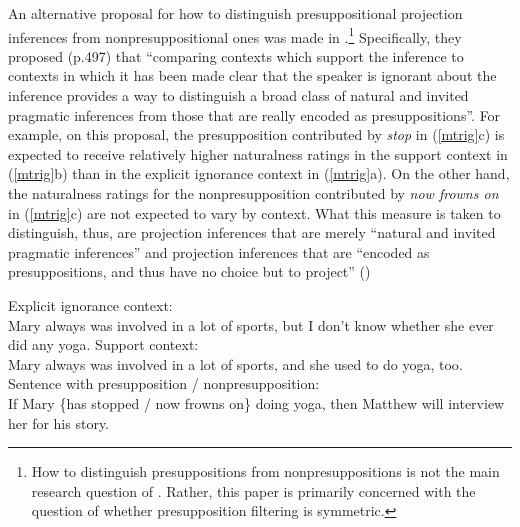 \documentclass[11pt,fleqn]{article}
\newcommand{\6}{\mbox{$[\hspace*{-.6mm}[$}}
\newcommand{\9}{\mbox{$]\hspace*{-.6mm}]$}}
\begin{document}
An alternative proposal for how to distinguish presuppositional projection inferences from nonpresuppositional ones was made in \citealt{mandelkern-etal2020}.\footnote{How to distinguish presuppositions from nonpresuppositions is not the main research question of \citealt{mandelkern-etal2020}. Rather, this paper is primarily concerned with the question of whether presupposition filtering is symmetric.} Specifically, they proposed (p.497) that ``comparing contexts which support the inference to contexts in which it has been made clear that the speaker is ignorant about the inference provides a way to distinguish a broad class of natural and invited pragmatic inferences from those that are really encoded as presuppositions''. For example, on this proposal, the presupposition contributed by \emph{stop} in (\ref{mtrig}c) is expected to receive relatively higher naturalness ratings in the support context in (\ref{mtrig}b) than in the explicit ignorance context in (\ref{mtrig}a). On the other hand, the naturalness ratings for the nonpresupposition contributed by \emph{now frowns on} in (\ref{mtrig}c) are not expected to vary by context. What this measure is taken to distinguish, thus, are projection inferences that are merely ``natural and invited pragmatic inferences'' and projection inferences that are ``encoded as presuppositions, and thus have no choice but to project'' (\citealt[497]{mandelkern-etal2020})

\begin{exe}
\ex\label{mtrig} \citealt[490f.]{mandelkern-etal2020}
\begin{xlist}
\ex Explicit ignorance context: \\ Mary always was involved in a lot of sports, but I don't know whether she ever did any yoga.
\ex Support context: \\ Mary always was involved in a lot of sports, and she used to do yoga, too.
\ex Sentence with presupposition / nonpresupposition: \\ If Mary \{has stopped / now frowns on\} doing yoga, then Matthew will interview her for his story.
\end{xlist}
\end{exe}
\end{document}
